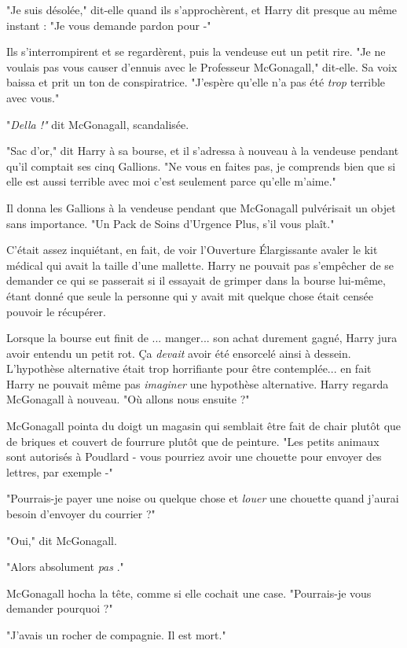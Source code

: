 "Je suis désolée," dit-elle quand ils s'approchèrent, et Harry dit presque au même instant : "Je vous demande pardon pour -"

Ils s'interrompirent et se regardèrent, puis la vendeuse eut un petit rire. "Je ne voulais pas vous causer d'ennuis avec le Professeur McGonagall," dit-elle. Sa voix baissa et prit un ton de conspiratrice. "J'espère qu'elle n'a pas été \emph{trop}  terrible avec vous."

"\emph{Della !"}  dit McGonagall, scandalisée.

"Sac d'or," dit Harry à sa bourse, et il s'adressa à nouveau à la vendeuse pendant qu'il comptait ses cinq Gallions. "Ne vous en faites pas, je comprends bien que si elle est aussi terrible avec moi c'est seulement parce qu'elle m'aime."

Il donna les Gallions à la vendeuse pendant que McGonagall pulvérisait un objet sans importance. "Un Pack de Soins d'Urgence Plus, s'il vous plaît."

C'était assez inquiétant, en fait, de voir l'Ouverture Élargissante avaler le kit médical qui avait la taille d'une mallette. Harry ne pouvait pas s'empêcher de se demander ce qui se passerait si il essayait de grimper dans la bourse lui-même, étant donné que seule la personne qui y avait mit quelque chose était censée pouvoir le récupérer.

Lorsque la bourse eut finit de ... manger... son achat durement gagné, Harry jura avoir entendu un petit rot. Ça \emph{devait}  avoir été ensorcelé ainsi à dessein. L'hypothèse alternative était trop horrifiante pour être contemplée... en fait Harry ne pouvait même pas \emph{imaginer}  une hypothèse alternative. Harry regarda McGonagall à nouveau. "Où allons nous ensuite ?"

McGonagall pointa du doigt un magasin qui semblait être fait de chair plutôt que de briques et couvert de fourrure plutôt que de peinture. "Les petits animaux sont autorisés à Poudlard - vous pourriez avoir une chouette pour envoyer des lettres, par exemple -"

"Pourrais-je payer une noise ou quelque chose et \emph{louer}  une chouette quand j'aurai besoin d'envoyer du courrier ?"

"Oui," dit McGonagall.

"Alors absolument \emph{pas} ."

McGonagall hocha la tête, comme si elle cochait une case. "Pourrais-je vous demander pourquoi ?"

"J'avais un rocher de compagnie. Il est mort."

